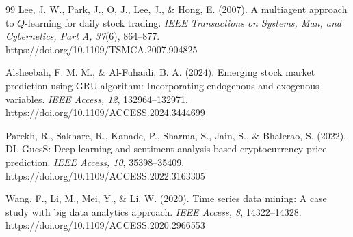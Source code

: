 \documentclass[10pt,a4paper,twocolumn]{article}
\begin{document}
\begin{thebibliography}{99}
 Lee, J. W., Park, J., O, J., Lee, J., \& Hong, E. (2007). A multiagent approach to $Q$-learning for daily stock trading. \textit{IEEE Transactions on Systems, Man, and Cybernetics, Part A, 37}(6), 864--877. https://doi.org/10.1109/TSMCA.2007.904825

 Alsheebah, F. M. M., \& Al-Fuhaidi, B. A. (2024). Emerging stock market prediction using GRU algorithm: Incorporating endogenous and exogenous variables. \textit{IEEE Access, 12}, 132964--132971. https://doi.org/10.1109/ACCESS.2024.3444699

 Parekh, R., Sakhare, R., Kanade, P., Sharma, S., Jain, S., \& Bhalerao, S. (2022). DL-GuesS: Deep learning and sentiment analysis-based cryptocurrency price prediction. \textit{IEEE Access, 10}, 35398--35409. https://doi.org/10.1109/ACCESS.2022.3163305

 Wang, F., Li, M., Mei, Y., \& Li, W. (2020). Time series data mining: A case study with big data analytics approach. \textit{IEEE Access, 8}, 14322--14328. https://doi.org/10.1109/ACCESS.2020.2966553

\end{thebibliography}
\end{document}
